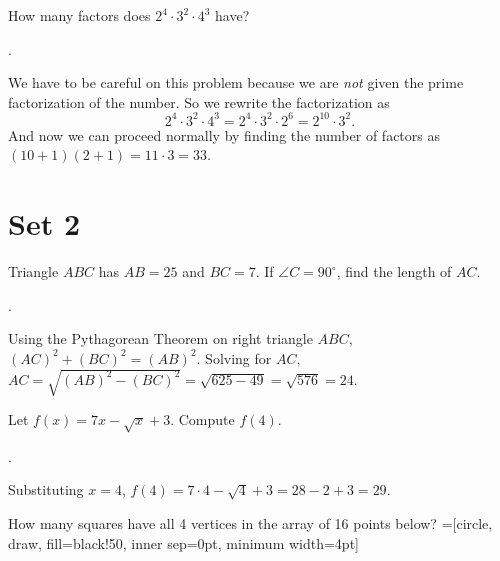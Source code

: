 \documentclass[11pt]{article}
\begin{document}
\begin{problem}
How many factors does $2^{4} \cdot 3^{2} \cdot 4^{3}$ have?
\end{problem}
\begin{answer}
.
\end{answer}
\begin{solution}
We have to be careful on this problem because we are \textit{not} given the prime factorization of the number. So we rewrite the factorization as
$$2^{4} \cdot 3^2 \cdot 4^3 = 2^4 \cdot 3^2 \cdot 2^6 = 2^{10} \cdot 3^2.$$
And now we can proceed normally by finding the number of factors as $(10+1)(2+1) = 11\cdot 3 = \boxed{33}$.
\end{solution}

\eject

\section*{Set 2}

\begin{problem}Triangle $ABC$ has $AB = 25$ and $BC = 7$. If $\angle C = 90 ^{\circ}$, find the length of $AC$.
\end{problem}

\begin{answer}
.
\end{answer}
\begin{solution}
Using the Pythagorean Theorem on right triangle $ABC$, $(AC)^2 + (BC)^2 = (AB)^2$. Solving for $AC$, $AC = \sqrt{(AB)^2 - (BC)^2} = \sqrt{625 - 49} = \sqrt{576} = \boxed{24}$.
\end{solution}

\begin{problem}Let $f(x) = 7x - \sqrt{x} + 3$. Compute $f(4)$.
\end{problem}

\begin{answer} . \end{answer}
\begin{solution}
Substituting $x = 4$, $f(4) = 7 \cdot 4 - \sqrt{4} + 3 = 28 - 2 + 3 = \boxed{29}.$
\end{solution}

\begin{problem}
How many squares have all 4 vertices in the array of 16 points below?
	=[circle, draw, fill=black!50, inner sep=0pt, minimum width=4pt]
	\newline
	\begin{center}
	\end{center}
\end{problem}
\end{document}
